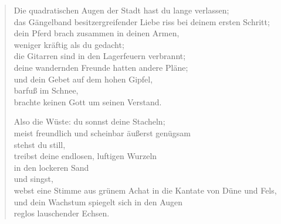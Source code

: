 
\cleartoverso


\begin{verse}

Die quadratischen Augen der Stadt hast du lange verlassen;\\
das Gängelband besitzergreifender Liebe riss bei deinem ersten Schritt;\\
dein Pferd brach zusammen in deinen Armen,\\
weniger kräftig als du gedacht;\\
die Gitarren sind in den Lagerfeuern verbrannt;\\
deine wandernden Freunde hatten andere Pläne;\\
und dein Gebet auf dem hohen Gipfel,\\
barfuß im Schnee,\\
brachte keinen Gott um seinen Verstand.

Also die Wüste: du sonnst deine Stacheln;\\
meist freundlich und scheinbar äußerst genügsam\\
stehst du still,\\
treibst deine endlosen, luftigen Wurzeln\\
in den lockeren Sand\\
und singst,\\
webst eine Stimme aus grünem Achat in die Kantate von Düne und Fels,\\
und dein Wachstum spiegelt sich in den Augen\\
reglos lauschender Echsen.

\end{verse}

\clearpage


